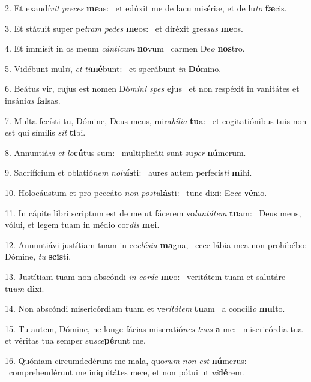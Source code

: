 2. Et exaudí\textit{vit} \textit{pre}\textit{ces} \textbf{me}as: \ast\  et edúxit me de lacu misériæ, et de lu\textit{to} \textbf{fæ}cis.\

3. Et státuit super pe\textit{tram} \textit{pe}\textit{des} \textbf{me}os: \ast\  et diréxit gres\textit{sus} \textbf{me}os.\

4. Et immísit in os meum \textit{cán}\textit{ti}\textit{cum} \textbf{no}vum \ast\  carmen De\textit{o} \textbf{nos}tro.\

5. Vidébunt mul\textit{ti}, \textit{et} \textit{ti}\textbf{mé}bunt: \ast\  et sperábunt \textit{in} \textbf{Dó}mino.\

6. Beátus vir, cujus est nomen Dó\textit{mi}\textit{ni} \textit{spes} \textbf{e}jus \ast\  et non respéxit in vanitátes et insáni\textit{as} \textbf{fal}sas.\

7. Multa fecísti tu, Dómine, Deus meus, mira\textit{bí}\textit{li}\textit{a} \textbf{tu}a: \ast\  et cogitatiónibus tuis non est qui símilis \textit{sit} \textbf{ti}bi.\

8. Annuntiá\textit{vi} \textit{et} \textit{lo}\textbf{cú}tus sum: \ast\  multiplicáti sunt su\textit{per} \textbf{nú}merum.\

9. Sacrifícium et oblatió\textit{nem} \textit{no}\textit{lu}\textbf{ís}ti: \ast\  aures autem perfecís\textit{ti} \textbf{mi}hi.\

10. Holocáustum et pro peccáto \textit{non} \textit{pos}\textit{tu}\textbf{lás}ti: \ast\  tunc dixi: Ec\textit{ce} \textbf{vé}nio.\

11. In cápite libri scriptum est de me ut fácerem vo\textit{lun}\textit{tá}\textit{tem} \textbf{tu}am: \ast\  Deus meus, vólui, et legem tuam in médio cor\textit{dis} \textbf{me}i.\

12. Annuntiávi justítiam tuam in ec\textit{clé}\textit{si}\textit{a} \textbf{ma}gna, \ast\  ecce lábia mea non prohibébo: Dómine, \textit{tu} \textbf{scis}ti.\

13. Justítiam tuam non abscóndi \textit{in} \textit{cor}\textit{de} \textbf{me}o: \ast\  veritátem tuam et salutáre tu\textit{um} \textbf{di}xi.\

14. Non abscóndi misericórdiam tuam et ve\textit{ri}\textit{tá}\textit{tem} \textbf{tu}am \ast\  a concíli\textit{o} \textbf{mul}to.\

15. Tu autem, Dómine, ne longe fácias miseratió\textit{nes} \textit{tu}\textit{as} \textbf{a} me: \ast\  misericórdia tua et véritas tua semper su\textit{sce}\textbf{pé}runt me.\

16. Quóniam circumdedérunt me mala, quo\textit{rum} \textit{non} \textit{est} \textbf{nú}merus: \ast\  comprehendérunt me iniquitátes meæ, et non pótui ut \textit{vi}\textbf{dé}rem.\

